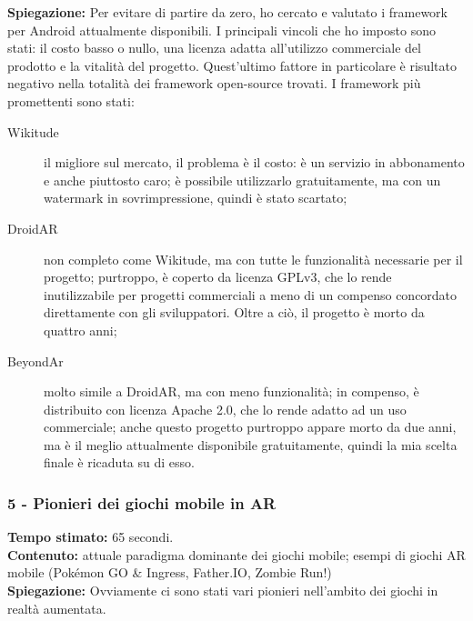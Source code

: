 \documentclass[
	twoside]				%
	{toptesi}				%
\begin{document}
	\textbf{Spiegazione:} Per evitare di partire da zero, ho cercato e valutato i framework per Android attualmente disponibili.
	I principali vincoli che ho imposto sono stati: il costo basso o nullo, una licenza adatta all'utilizzo commerciale del prodotto e la vitalità del progetto.
	Quest'ultimo fattore in particolare è risultato negativo nella totalità dei framework open-source trovati.
	I framework più promettenti sono stati:
	\begin{description}
		\item[Wikitude] il migliore sul mercato, il problema è il costo: è un servizio in abbonamento e anche piuttosto caro; è possibile utilizzarlo gratuitamente, ma con un watermark in sovrimpressione, quindi è stato scartato;
		
		\item[DroidAR] non completo come Wikitude, ma con tutte le funzionalità necessarie per il progetto; purtroppo, è coperto da licenza GPLv3, che lo rende inutilizzabile per progetti commerciali a meno di un compenso concordato direttamente con gli sviluppatori. Oltre a ciò, il progetto è morto da quattro anni;
		
		\item[BeyondAr] molto simile a DroidAR, ma con meno funzionalità; in compenso, è distribuito con licenza Apache 2.0, che lo rende adatto ad un uso commerciale; anche questo progetto purtroppo appare morto da due anni, ma è il meglio attualmente disponibile gratuitamente, quindi la mia scelta finale è ricaduta su di esso.
	\end{description}
	
	\subsubsection{5 - Pionieri dei giochi mobile in AR}
	
	\textbf{Tempo stimato:} 65 secondi. \\
	
	\textbf{Contenuto:} attuale paradigma dominante dei giochi mobile; esempi di giochi AR mobile (Pokémon GO \& Ingress, Father.IO, Zombie Run!) \\
	
	\textbf{Spiegazione:} Ovviamente ci sono stati vari pionieri nell'ambito dei giochi in realtà aumentata.
	
\end{document}
